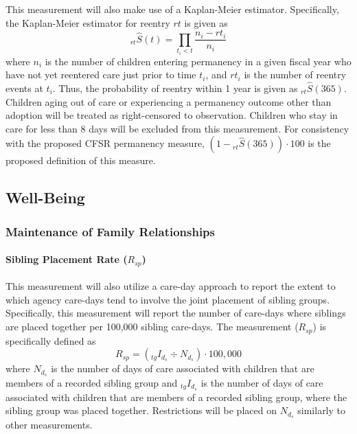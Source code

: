 \documentclass[12pt]{article}\usepackage[]{graphicx}\usepackage[]{color}
\begin{document}
This measurement will also make use of a Kaplan-Meier estimator. Specifically, the Kaplan-Meier estimator for reentry $rt$ is given as
\begin{equation}\label{eq:KM3}
{}_{rt}\hat S(t) = \prod\limits_{t_i<t} \frac{n_i-rt_{i}}{n_i}
\end{equation}
where $n_{i}$ is the number of children entering permanency in a given fiscal year who have not yet reentered care just prior to time $t_{i}$, and $rt_{i}$ is the number of reentry events at $t_{i}$. Thus, the probability of reentry within 1 year is given as ${}_{rt}\hat S(365)$. Children aging out of care or experiencing a permanency outcome other than adoption will be treated as right-censored to observation. Children who stay in care for less than 8 days will be excluded from this measurement. For consistency with the proposed CFSR permanency measure, $(1 - {}_{rt}\hat S(365)) \cdot 100$ is the proposed definition of this measure.


\subsection{Well-Being}

\subsubsection{Maintenance of Family Relationships}

\paragraph{Sibling Placement Rate ($R_{sp}$)}

This measurement will also utilize a care-day approach to report the extent to which agency care-days tend to involve the joint placement of sibling groups. Specifically, this measurement will report the number of care-days where siblings are placed together per 100,000 sibling care-days. The measurement ($R_{sp}$) is specifically defined as 
\begin{equation}\label{eq:Rsp}
R_{sp} = ({}_{tg}I_{d_s} \div N_{d_s}) \cdot 100,000
\end{equation}
where $N_{d_s}$ is the number of days of care associated with children that are members of a recorded sibling group and ${}_{tg}I_{d_s}$ is the number of days of care associated with children that are members of a recorded sibling group, where the sibling group was placed together. Restrictions will be placed on $N_{d_s}$ similarly to other measurements. 
\end{document}
